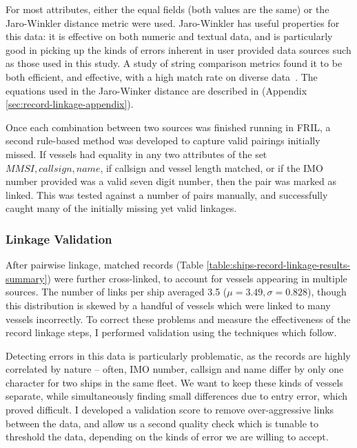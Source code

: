 \documentclass[12pt,letterpaper]{article}
\begin{document}
For most attributes, either the equal fields (both values are the same) or the Jaro-Winkler distance metric were used. Jaro-Winkler has useful properties for this data: it is effective on both numeric and textual data, and is particularly good in picking up the kinds of errors inherent in user provided data sources such as those used in this study. A study of string comparison metrics found it to be both efficient, and effective, with a high match rate on diverse data~\citep{Cohen2003}. The equations used in the Jaro-Winker distance are described in (Appendix \ref{sec:record-linkage-appendix}).

Once each combination between two sources was finished running in FRIL, a second rule-based method was developed to capture valid pairings initially missed. If vessels had equality in any two attributes of the set ${MMSI, callsign, name}$, if callsign and vessel length matched, or if the IMO number provided was a valid seven digit number, then the pair was marked as linked. This was tested against a number of pairs manually, and successfully caught many of the initially missing yet valid linkages.

\subsubsection{Linkage Validation}

After pairwise linkage, matched records (Table \ref{table:ships-record-linkage-results-summary}) were further cross-linked, %
 to account for vessels appearing in multiple sources. The number of links per ship averaged 3.5 ($\mu = 3.49, \sigma = 0.828$), %
though this distribution is skewed by a handful of vessels which were linked to many vessels incorrectly. To correct these problems and measure the effectiveness of the record linkage steps, I performed validation using the techniques which follow.

Detecting errors in this data is particularly problematic, as the records are highly correlated by nature -- often, IMO number, callsign and name differ by only one character for two ships in the same fleet. We want to keep these kinds of vessels separate, while simultaneously finding small differences due to entry error, which proved difficult. I developed a validation score to remove over-aggressive links between the data, and allow us a second quality check which is tunable to threshold the data, depending on the kinds of error we are willing to accept.
\end{document}
